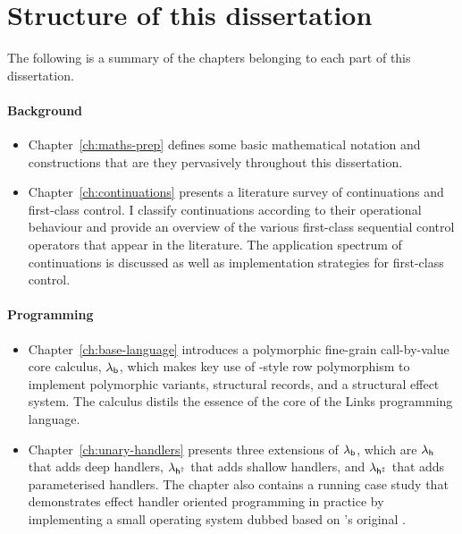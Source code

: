 \documentclass[12pt,phd,lfcs,twoside,openright,logo,leftchapter,normalheadings]{infthesis}
\theoremstyle{plain}
\theoremstyle{definition}
\begin{document}
\section{Structure of this dissertation}

The following is a summary of the chapters belonging to each part of
this dissertation.

\paragraph{Background}
\begin{itemize}
  \item Chapter~\ref{ch:maths-prep} defines some basic mathematical
notation and constructions that are they pervasively throughout this
dissertation.

  \item Chapter~\ref{ch:continuations} presents a literature survey of
continuations and first-class control. I classify continuations
according to their operational behaviour and provide an overview of
the various first-class sequential control operators that appear in
the literature. The application spectrum of continuations is discussed
as well as implementation strategies for first-class control.
\end{itemize}

\paragraph{Programming}
\begin{itemize}
  \item Chapter~\ref{ch:base-language} introduces a polymorphic fine-grain
call-by-value core calculus, $\lambda_{\mathsf{b}}$, which makes key use of
\citeauthor{Remy93}-style row polymorphism to implement polymorphic
variants, structural records, and a structural effect system. The
calculus distils the essence of the core of the Links programming
language.

  \item Chapter~\ref{ch:unary-handlers} presents three extensions of $\lambda_{\mathsf{b}}$,
which are $\lambda_{\mathsf{h}}$ that adds deep handlers, $\lambda_{\mathsf{h^\dagger}}$ that adds shallow
handlers, and $\lambda_{\mathsf{h^{\ddagger}}}$ that adds parameterised handlers. The chapter
also contains a running case study that demonstrates effect handler
oriented programming in practice by implementing a small operating
system dubbed \OSname{} based on \citeauthor{RitchieT74}'s original
\UNIX{}.
\end{itemize}
\end{document}

